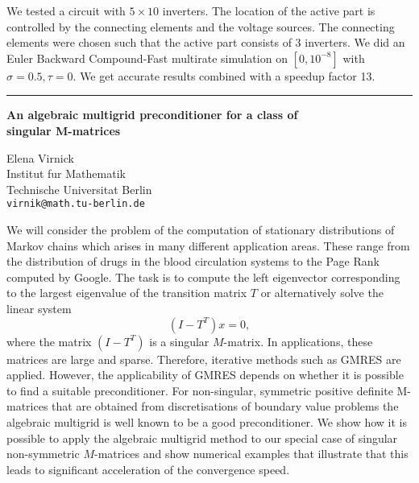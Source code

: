 \documentclass[twosided]{report}
\begin{document}
We tested a
circuit with $5 \times 10$ inverters. The location of the
active part is controlled by the connecting elements and the
voltage sources. The connecting elements were chosen such
that the active part consists of 3 inverters. We did an
Euler Backward Compound-Fast multirate simulation on
$[0,10^{-8}]$ with $\sigma = 0.5,\tau = 0$. We get accurate
results combined with a speedup factor 13. 



	\begin{center} \rule{6in}{1pt} \end{center}

\begin{center}
{\large			%
{\bf An algebraic multigrid preconditioner for a class of \\
	singular M-matrices}}

	Elena Virnick \\
	Institut f\:ur Mathematik \\
	Technische Universit\:at Berlin \\
	{\tt virnik@math.tu-berlin.de}
\end{center}
We will consider the problem of the computation of stationary
distributions of Markov chains which arises in many different
application areas. These range from the distribution of drugs
in the blood circulation systems to the Page Rank computed by
Google. The task is to compute the left eigenvector
corresponding to the largest eigenvalue of the transition
matrix $T$ or alternatively solve the linear system
$$(I-T^T)x=0,$$
where the matrix $(I-T^T)$ is a singular $M$-matrix.
In applications, these matrices are large and sparse.
Therefore, iterative methods such as GMRES are applied.
However, the applicability of GMRES depends on whether
it is possible to find a suitable preconditioner.
For non-singular, symmetric positive definite M-matrices
that are obtained from discretisations of boundary
value problems the algebraic multigrid is well known
to be a good preconditioner. We show how it is possible
to apply the algebraic multigrid method to our special
case of singular non-symmetric $M$-matrices and show
numerical examples that illustrate that this leads to
significant acceleration of the convergence speed.
\end{document}
